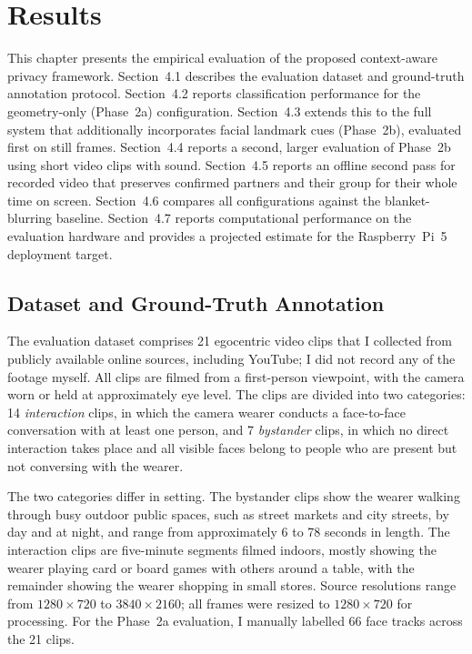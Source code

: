 \newsavebox{\fitbox}
\newcommand{\fitwidth}[1]{\sbox{\fitbox}{#1}%
  \ifdim\wd\fitbox>\linewidth\resizebox{\linewidth}{!}{\usebox{\fitbox}}%
  \else\usebox{\fitbox}\fi}

\section{Results}
\label{sec:results}

This chapter presents the empirical evaluation of the proposed context-aware
privacy framework. Section~4.1 describes the evaluation dataset and ground-truth
annotation protocol. Section~4.2 reports classification performance for the
geometry-only (Phase~2a) configuration. Section~4.3 extends this to the full
system that additionally incorporates facial landmark cues (Phase~2b), evaluated
first on still frames. Section~4.4 reports a second, larger evaluation of Phase~2b
using short video clips with sound. Section~4.5 reports an offline second pass for
recorded video that preserves confirmed partners and their group for their whole
time on screen. Section~4.6 compares all configurations against the
blanket-blurring baseline. Section~4.7 reports computational performance on the
evaluation hardware and provides a projected estimate for the Raspberry~Pi~5
deployment target.

\subsection{Dataset and Ground-Truth Annotation}
\label{sec:dataset}

The evaluation dataset comprises 21 egocentric video clips that I collected from
publicly available online sources, including YouTube; I did not record any of the
footage myself. All clips are filmed from a first-person viewpoint, with the camera worn
or held at approximately eye level. The clips are divided into two categories:
14 \emph{interaction} clips, in which the camera wearer conducts a face-to-face
conversation with at least one person, and 7 \emph{bystander} clips, in which no
direct interaction takes place and all visible faces belong to people who are
present but not conversing with the wearer.

The two categories differ in setting. The bystander clips show the wearer walking
through busy outdoor public spaces, such as street markets and city streets, by day
and at night, and range from approximately 6 to 78 seconds in length. The
interaction clips are five-minute segments filmed indoors, mostly showing the wearer
playing card or board games with others around a table, with the remainder showing
the wearer shopping in small stores. Source resolutions range from
$1280 \times 720$ to $3840 \times 2160$; all frames were resized to
$1280 \times 720$ for processing. For the Phase~2a evaluation, I manually
labelled 66 face tracks across the 21 clips.

